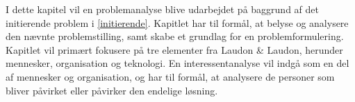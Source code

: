 I dette kapitel vil en problemanalyse blive udarbejdet på baggrund af det initierende problem i \cref{initierende}. Kapitlet har til formål, at belyse og analysere den nævnte problemstilling, samt skabe et grundlag for en problemformulering. Kapitlet vil primært fokusere på tre elementer fra Laudon \& Laudon, herunder mennesker, organisation og teknologi. En interessentanalyse vil indgå som en del af mennesker og organisation, og har til formål, at analysere de personer som bliver påvirket eller påvirker den endelige løsning.